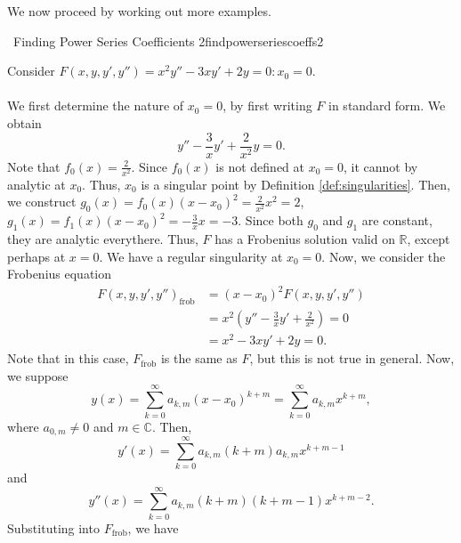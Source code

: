         We now proceed by working out more examples.
        \begin{example}{\Difficulty\,\Difficulty\,\,Finding Power Series Coefficients 2}{findpowerseriescoeffs2}
            
            Consider \(F(x,y,y',y'')=x^2y''-3xy'+2y=0:x_0=0\).
            \\
            \\
            We first determine the nature of \(x_0=0\), by first writing \(F\) in standard form. We obtain
            \begin{equation*}
                y''-\frac{3}{x}y'+\frac{2}{x^2}y=0.
            \end{equation*} 
            Note that \(f_0(x)=\frac{2}{x^2}\). Since \(f_0(x)\) is not defined at \(x_0=0\), it cannot by analytic at \(x_0\). Thus, \(x_0\) is a singular point by Definition \ref{def:singularities}. Then, we construct \(g_0(x)=f_0(x)(x-x_0)^2=\frac{2}{x^2}x^2=2\), \(g_1(x)=f_1(x)(x-x_0)^2=-\frac{3}{x}x=-3\). Since both \(g_0\) and \(g_1\) are constant, they are analytic everythere. Thus, \(F\) has a Frobenius solution valid on \(\mathbb{R}\), except perhaps at \(x=0\). We have a regular singularity at \(x_0=0\). Now, we consider the Frobenius equation 
            \begin{align*}
                F(x,y,y',y'')_{\text{frob}}&=(x-x_0)^2F(x,y,y',y'') \\
                &=x^2\left(y''-\frac{3}{x}y'+\frac{2}{x^2}\right)=0 \\
                &=x^2-3xy'+2y=0.
            \end{align*}
            Note that in this case, \(F_{\text{frob}}\) is the same as \(F\), but this is not true in general. Now, we suppose
            \begin{equation*}
                y(x)=\sum_{k=0}^\infty a_{k,m}(x-x_0)^{k+m}=\sum_{k=0}^\infty a_{k,m}x^{k+m},
            \end{equation*}
            where \(a_{0,m}\neq0\) and \(m\in\mathbb{C}\). Then,
            \begin{equation*}
                y'(x)=\sum_{k=0}^\infty a_{k,m}(k+m)a_{k,m}x^{k+m-1}
            \end{equation*}
            and
            \begin{equation*}
                y''(x)=\sum_{k=0}^\infty a_{k,m}(k+m)(k+m-1)x^{k+m-2}.
            \end{equation*}
            Substituting into \(F_{\text{frob}}\), we have
            \begin{align*}

\end{align*}
\end{example}

